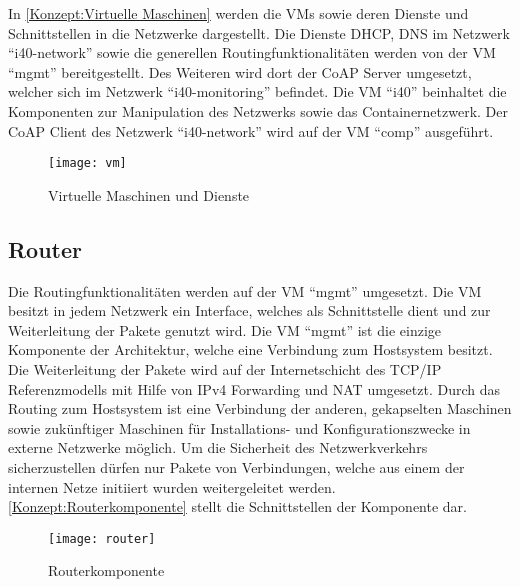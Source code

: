 In \autoref{Konzept:Virtuelle Maschinen} werden die \ac{VM}s sowie deren Dienste und Schnittstellen in die Netzwerke dargestellt. Die Dienste \ac{DHCP}, \ac{DNS} im Netzwerk "`i40-network"' sowie die generellen Routingfunktionalitäten werden von der \ac{VM} "`mgmt"' bereitgestellt. Des Weiteren wird dort der \ac{CoAP} Server umgesetzt, welcher sich im Netzwerk "`i40-monitoring"' befindet. Die \ac{VM} "`i40"' beinhaltet die Komponenten zur Manipulation des Netzwerks sowie das Containernetzwerk. Der \ac{CoAP} Client des Netzwerk "`i40-network"' wird auf der \ac{VM} "`comp"' ausgeführt.

\begin{figure}[h]
  \centering
  \texttt{[image: vm]}
  \caption{Virtuelle Maschinen und Dienste} 
  \label{Konzept:Virtuelle Maschinen}
\end{figure}

\subsection{Router}
Die Routingfunktionalitäten werden auf der \ac{VM} "`mgmt"' umgesetzt. Die \ac{VM} besitzt in jedem Netzwerk ein Interface, welches als Schnittstelle dient und zur Weiterleitung der Pakete genutzt wird. Die \ac{VM} "`mgmt"' ist die einzige Komponente der Architektur, welche eine Verbindung zum Hostsystem besitzt. Die Weiterleitung der Pakete wird auf der Internetschicht des \ac{TCP}/\ac{IP} Referenzmodells mit Hilfe von \ac{IP}v4 Forwarding und \ac{NAT} umgesetzt. Durch das Routing zum Hostsystem ist eine Verbindung der anderen, gekapselten Maschinen sowie zukünftiger Maschinen für Installations- und Konfigurationszwecke in externe Netzwerke möglich. Um die Sicherheit des Netzwerkverkehrs sicherzustellen dürfen nur Pakete von Verbindungen, welche aus einem der internen Netze initiiert wurden weitergeleitet werden. \autoref{Konzept:Routerkomponente} stellt die Schnittstellen der Komponente dar.  

\begin{figure}[h]
  \centering
  \texttt{[image: router]}
  \caption{Routerkomponente} 
  \label{Konzept:Routerkomponente}
\end{figure}

